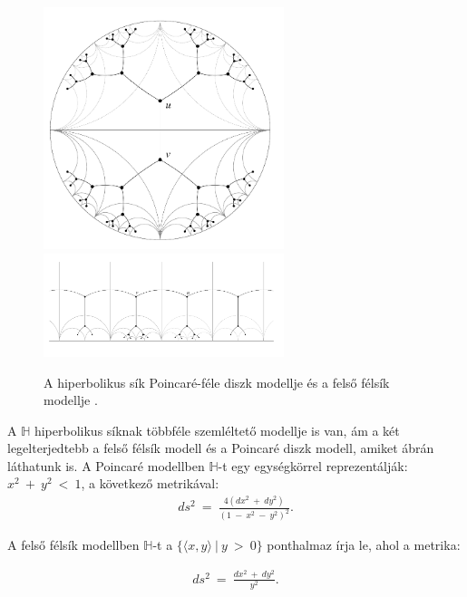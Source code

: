   \begin{figure}[h]
    \centering
    \includegraphics[width=70mm]{./figures/3-reg_disk.png}\hspace{5mm}
    \includegraphics[width=70mm,keepaspectratio=true]{./figures/3-reg_half_plane.png}

    \caption{A hiperbolikus sík Poincaré-féle diszk modellje és a felső félsík modellje \cite{Klein07}.}
    \label{fig:figure_hiperbolikusabrak}
  \end{figure}

  A $\mathbb{H}$ hiperbolikus síknak többféle szemléltető modellje is van, ám a két legelterjedtebb a felső félsík modell és a Poincaré diszk modell, amiket  ábrán láthatunk is. A Poincaré modellben $\mathbb{H}$-t egy egységkörrel reprezentálják: $x^2~+~y^2~<~1$, a következő metrikával:
  \begin{align}
    ds^2~=~\frac{4(dx^2~+~dy^2)}{(1~-~x^2~-~y^2)^2}.
  \end{align}

  A felső félsík modellben $\mathbb{H}$-t a $\{\langle x,y\rangle ~|~y~>~0\}$ ponthalmaz írja le, ahol a metrika:

  \begin{align}
    ds^2~=~\frac{dx^2~+~dy^2}{y^2}.
  \end{align}

